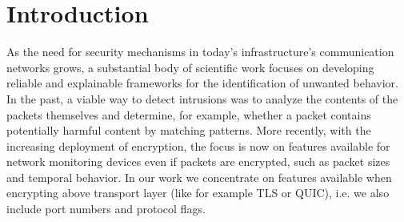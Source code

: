 \documentclass[conference]{IEEEtran}
\newcommand\note[2]{{\color{#1}#2}}
\begin{document}
\section{Introduction}
\label{sec:introduction}


As the need for security mechanisms in today's infrastructure's communication networks grows, a substantial body of scientific work focuses on developing reliable and explainable frameworks for the identification of unwanted behavior. In the past, a viable way to detect intrusions was to analyze the contents of the packets themselves and determine, for example, whether a packet contains potentially harmful content by matching patterns. More recently, with the increasing deployment of encryption, the focus is now on features available for network monitoring devices even if packets are encrypted, such as packet sizes and temporal behavior. In our work we concentrate on features available when encrypting above transport layer (like for example TLS or QUIC), i.e. we also include port numbers and protocol flags.



\end{document}
